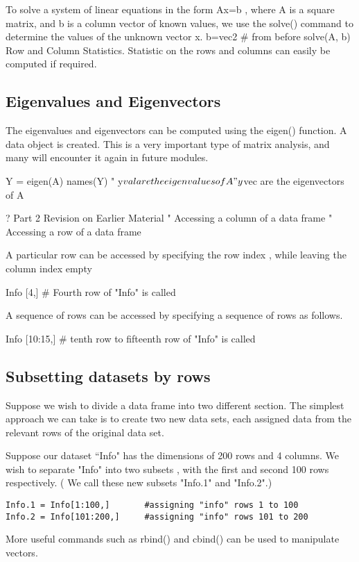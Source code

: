 To solve a system of linear equations in the form Ax=b , where A is a square matrix, and b is a column vector of known values, we use the solve() command to determine the values of the unknown vector x.
b=vec2  # from before
solve(A, b)
Row and Column Statistics.
Statistic on the rows and columns can easily be computed if required.
\subsection{Eigenvalues and Eigenvectors}
The eigenvalues and eigenvectors can be computed using the eigen() function.  A data object is created.
This is a very important type of matrix analysis, and many will encounter it again in future modules.

Y = eigen(A)
names(Y)
"	y$val are the eigenvalues of A
"	y$vec are the eigenvectors of A

?
Part 2 Revision on Earlier Material
"	Accessing a column of a data frame
"	Accessing a row of a data frame

A particular row can be accessed by specifying the row index , while leaving the column index empty

Info [4,]			# Fourth row of "Info" is called

A sequence of rows can be accessed by specifying a sequence of rows as follows.

Info [10:15,]		# tenth row to fifteenth row of "Info" is called


\subsection{Subsetting datasets by rows}

Suppose we wish to divide a data frame into two different section. The simplest approach we can take is to create two new data sets, each assigned data from the relevant rows of the original data set.

Suppose our dataset ``Info" has the dimensions of 200 rows and 4 columns. We wish to separate "Info" into two subsets , with the first and second 100 rows respectively. ( We call these new subsets "Info.1" and "Info.2".)
\begin{verbatim}
Info.1 = Info[1:100,]		#assigning "info" rows 1 to 100
Info.2 = Info[101:200,]		#assigning "info" rows 101 to 200
\end{verbatim}

More useful commands such as rbind() and cbind()  can be used to manipulate vectors.

